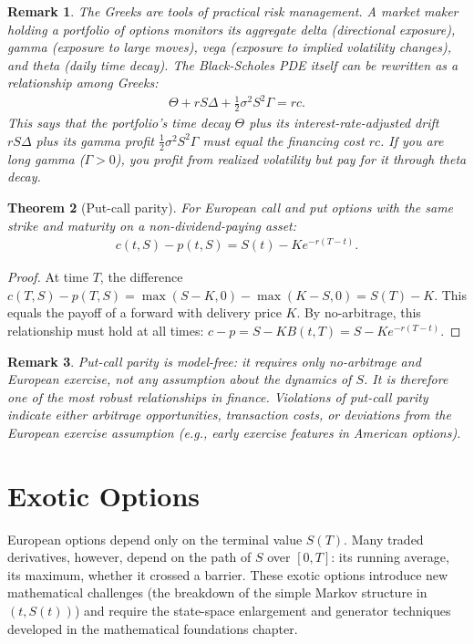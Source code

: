 \documentclass{report}
\theoremstyle{spacedplain}
\newtheorem{theorem}{Theorem}[section]
\theoremstyle{spaceddefinition}
\theoremstyle{spacedremark}
\newtheorem{remark}[theorem]{Remark}
\begin{document}
\begin{remark}
The Greeks are tools of practical risk management. A market maker holding a portfolio of options monitors its aggregate delta (directional exposure), gamma (exposure to large moves), vega (exposure to implied volatility changes), and theta (daily time decay). The Black-Scholes PDE itself can be rewritten as a relationship among Greeks:
\begin{align}
    \Theta + rS\Delta + \frac{1}{2}\sigma^2 S^2 \Gamma = rc.
\end{align}
This says that the portfolio's time decay $\Theta$ plus its interest-rate-adjusted drift $rS\Delta$ plus its gamma profit $\frac{1}{2}\sigma^2 S^2 \Gamma$ must equal the financing cost $rc$. If you are long gamma ($\Gamma > 0$), you profit from realized volatility but pay for it through theta decay.
\end{remark}

\begin{theorem}[Put-call parity]
For European call and put options with the same strike and maturity on a non-dividend-paying asset:
\begin{align}
    c(t,S) - p(t,S) = S(t) - K e^{-r(T-t)}.
\end{align}
\end{theorem}

\begin{proof}
At time $T$, the difference $c(T,S) - p(T,S) = \max(S-K,0) - \max(K-S,0) = S(T) - K$. This equals the payoff of a forward with delivery price $K$. By no-arbitrage, this relationship must hold at all times: $c - p = S - KB(t,T) = S - Ke^{-r(T-t)}$.
\end{proof}

\begin{remark}
Put-call parity is model-free: it requires only no-arbitrage and European exercise, not any assumption about the dynamics of $S$. It is therefore one of the most robust relationships in finance. Violations of put-call parity indicate either arbitrage opportunities, transaction costs, or deviations from the European exercise assumption (e.g., early exercise features in American options).
\end{remark}


\section{Exotic Options}

European options depend only on the terminal value $S(T)$. Many traded derivatives, however, depend on the path of $S$ over $[0,T]$: its running average, its maximum, whether it crossed a barrier. These exotic options introduce new mathematical challenges (the breakdown of the simple Markov structure in $(t, S(t))$) and require the state-space enlargement and generator techniques developed in the mathematical foundations chapter.
\end{document}
